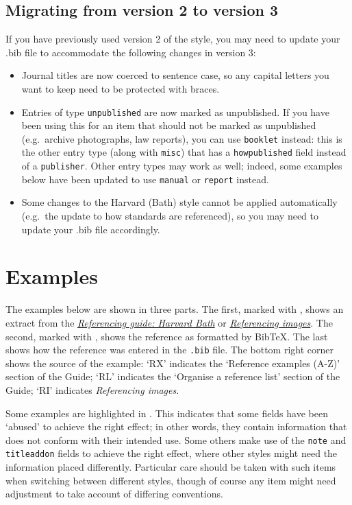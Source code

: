\documentclass[10pt,a4paper]{article}
\begin{document}
\subsection{Migrating from version 2 to version 3}

If you have previously used version 2 of the style, you may need to update your
.bib file to accommodate the following changes in version 3:

\begin{itemize}
\item
  Journal titles are now coerced to sentence case, so any capital letters you
  want to keep need to be protected with braces.
\item
  Entries of type \texttt{unpublished} are now marked as unpublished. If you
  have been using this for an item that should not be marked as unpublished
  (e.g.~archive photographs, law reports), you can use \texttt{booklet} instead:
  this is the other entry type (along with \texttt{misc}) that has a
  \texttt{howpublished} field instead of a \texttt{publisher}.
  Other entry types may work as well; indeed, some examples below have been updated to use \texttt{manual} or \texttt{report} instead.
\item
  Some changes to the Harvard (Bath) style cannot be applied automatically
  (e.g.~the update to how standards are referenced), so you may need to update
  your .bib file accordingly.
\end{itemize}

\section{Examples}

The examples below are shown in three parts.
The first, marked with \faBook, shows an extract from the
\href{https://library.bath.ac.uk/referencing/harvard-bath}{\emph{Referencing guide: Harvard Bath}} or
\href{https://library.bath.ac.uk/images/referencing}{\emph{Referencing images}}.
The second, marked with \faCog, shows the reference as formatted by Bib\TeX.
The last shows how the reference was entered in the \texttt{.bib} file.
The bottom right corner shows the source of the example: `RX' indicates the `Reference examples (A-Z)' section of the Guide; `RL' indicates the `Organise a reference list' section of the Guide; `RI' indicates \emph{Referencing images}.

Some examples are highlighted in
.
This indicates that some fields have been `abused' to achieve the right effect;
in other words, they contain information that does not conform with their intended use.
Some others make use of the \texttt{note} and \texttt{titleaddon} fields to achieve
the right effect, where other styles might need the information placed differently.
Particular care should be taken with such items when switching between different styles,
though of course any item might need adjustment to take account of differing conventions.
\end{document}
